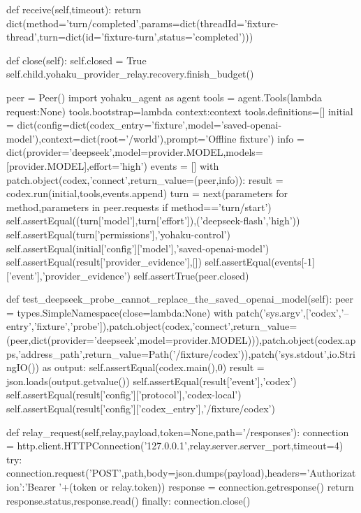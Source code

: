             def receive(self,timeout):
                return dict(method='turn/completed',params=dict(threadId='fixture-thread',turn=dict(id='fixture-turn',status='completed')))

            def close(self):
                self.closed = True
                self.child.yohaku_provider_relay.recovery.finish_budget()

        peer = Peer()
        import yohaku_agent as agent
        tools = agent.Tools(lambda request:None)
        tools.bootstrap=lambda context:context
        tools.definitions=[]
        initial = dict(config=dict(codex_entry='fixture',model='saved-openai-model'),context=dict(root='/world'),prompt='Offline fixture')
        info = dict(provider='deepseek',model=provider.MODEL,models=[provider.MODEL],effort='high')
        events = []
        with patch.object(codex,'connect',return_value=(peer,info)):
            result = codex.run(initial,tools,events.append)
        turn = next(parameters for method,parameters in peer.requests if method=='turn/start')
        self.assertEqual((turn['model'],turn['effort']),('deepseek-flash','high'))
        self.assertEqual(turn['permissions'],'yohaku-control')
        self.assertEqual(initial['config']['model'],'saved-openai-model')
        self.assertEqual(result['provider_evidence'],[])
        self.assertEqual(events[-1]['event'],'provider_evidence')
        self.assertTrue(peer.closed)

    def test_deepseek_probe_cannot_replace_the_saved_openai_model(self):
        peer = types.SimpleNamespace(close=lambda:None)
        with patch('sys.argv',['codex','--entry','fixture','probe']),patch.object(codex,'connect',return_value=(peer,dict(provider='deepseek',model=provider.MODEL))),patch.object(codex.apps,'address_path',return_value=Path('/fixture/codex')),patch('sys.stdout',io.StringIO()) as output:
            self.assertEqual(codex.main(),0)
        result = json.loads(output.getvalue())
        self.assertEqual(result['event'],'codex')
        self.assertEqual(result['config']['protocol'],'codex-local')
        self.assertEqual(result['config']['codex_entry'],'/fixture/codex')

    def relay_request(self,relay,payload,token=None,path='/responses'):
        connection = http.client.HTTPConnection('127.0.0.1',relay.server.server_port,timeout=4)
        try:
            connection.request('POST',path,body=json.dumps(payload),headers={'Authorization':'Bearer '+(token or relay.token)})
            response = connection.getresponse()
            return response.status,response.read()
        finally:
            connection.close()

